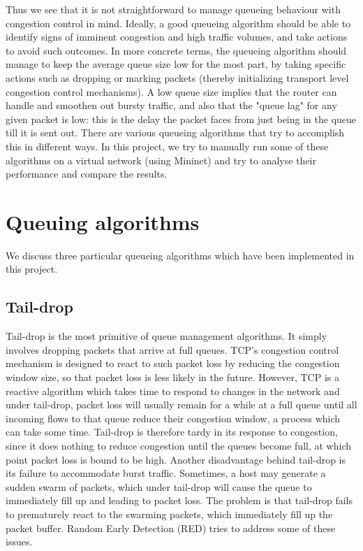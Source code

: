\documentclass[12pt]{article}
\begin{document}
Thus we see that it is not straightforward to manage queueing behaviour with congestion control in mind. Ideally, a good queueing algorithm should be able to identify signs of imminent congestion and high traffic volumes, and take actions to avoid such outcomes. In more concrete terms, the queueing algorithm should manage to keep the average queue size low for the most part, by taking specific actions such as dropping or marking packets (thereby initializing transport level congestion control mechanisms). A low queue size implies that the router can handle and smoothen out bursty traffic, and also that the "queue lag" for any given packet is low: this is the delay the packet faces from just being in the queue till it is sent out. There are various queueing algorithms that try to accomplish this in different ways. In this project, we try to manually run some of these algorithms on a virtual network (using Mininet) and try to analyse their performance and compare the results.

\section{Queuing algorithms}
We discuss three particular queueing algorithms which have been implemented in this project.

\subsection{Tail-drop}
Tail-drop is the most primitive of queue management algorithms. It simply involves dropping packets that arrive at full queues. TCP's congestion control mechanism is designed to react to such packet loss by reducing the congestion window size, so that packet loss is less likely in the future. However, TCP is a reactive algorithm which takes time to respond to changes in the network and under tail-drop, packet loss will usually remain for a while at a full queue until all incoming flows to that queue reduce their congestion window, a process which can take some time. Tail-drop is therefore tardy in its response to congestion, since it does nothing to reduce congestion until the queues become full, at which point packet loss is bound to be high. Another disadvantage behind tail-drop is its failure to accommodate burst traffic. Sometimes, a host may generate a sudden swarm of packets, which under tail-drop will cause the queue to immediately fill up and leading to packet loss. The problem is that tail-drop fails to prematurely react to the swarming packets, which immediately fill up the packet buffer. Random Early Detection (RED) tries to address some of these issues. 
	
\end{document}

